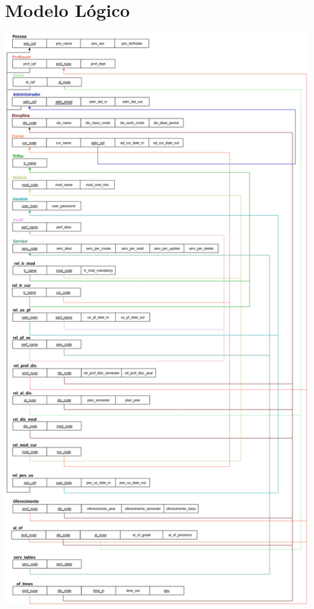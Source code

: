 \documentclass{article}
\begin{document}
    \section{Modelo Lógico}
    
    \includegraphics[width=\textwidth,height=\textheight,keepaspectratio]{Logico.png}
    
\end{document}
